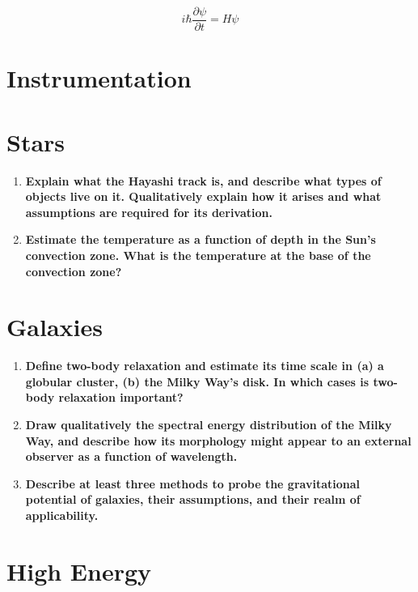 \documentclass[12pt, letterpaper, preprint]{aastex}
\begin{document}
\begin{equation}
i \hbar \frac{\partial \psi}{\partial t} = H \psi 
\end{equation}

\section*{Instrumentation}

\section*{Stars}
\begin{enumerate}
  \item \textbf{Explain what the Hayashi track is, 
      and describe what types of objects live on it.
      Qualitatively explain how it arises and what 
      assumptions are required for its derivation.}
  \item \textbf{Estimate the temperature as a function 
      of depth in the Sun’s convection zone.
      What is the temperature at the base of the convection zone?}
\end{enumerate}

\section*{Galaxies}

\begin{enumerate}

\item \textbf{Define two-body relaxation and estimate its time scale in (a) a globular cluster, (b) the Milky Way's disk. In which cases is two-body relaxation important?}

\item \textbf{Draw qualitatively the spectral energy distribution of the Milky Way, and describe how its morphology might appear to an external observer as a function of wavelength.}

\item \textbf{Describe at least three methods to probe the gravitational potential of galaxies, their assumptions, and their realm of applicability.}

\end{enumerate}

\section*{High Energy}
\end{document}
